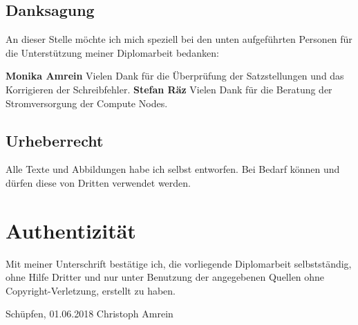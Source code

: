 \newpage 
\subsection{Danksagung}
An dieser Stelle möchte ich mich speziell bei den unten aufgeführten Personen für die Unterstützung meiner Diplomarbeit bedanken:

\textbf{Monika Amrein}\newline
Vielen Dank für die Überprüfung der Satzstellungen und das Korrigieren der Schreibfehler.\newline
\textbf{Stefan Räz}\newline
Vielen Dank für die Beratung der Stromversorgung der Compute Nodes.

\subsection{Urheberrecht}
Alle Texte und Abbildungen habe ich selbst entworfen. Bei Bedarf können und dürfen diese von Dritten verwendet werden.

\newpage
\section{Authentizität}
Mit meiner Unterschrift bestätige ich, die vorliegende Diplomarbeit selbstständig, ohne Hilfe Dritter und nur unter Benutzung der angegebenen Quellen ohne Copyright-Verletzung, erstellt zu haben.

Schüpfen, 01.06.2018\newline
\newline
\newline
Christoph Amrein

